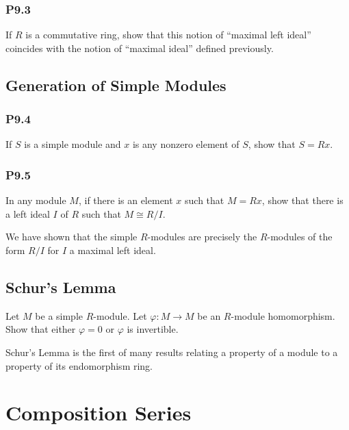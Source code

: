 \documentclass[lang=cn,11pt]{template}
\begin{document}
\subsection*{P9.3} If \( R \) is a commutative ring, show that this notion of “maximal left ideal” coincides with the notion of “maximal ideal” defined previously.

\section{Generation of Simple Modules}

\subsection*{P9.4} If \( S \) is a simple module and \( x \) is any nonzero element of \( S \), show that \( S = Rx \).

\subsection*{P9.5} In any module \( M \), if there is an element \( x \) such that \( M = Rx \), show that there is a left ideal \( I \) of \( R \) such that \( M \cong R/I \).

\begin{remark}
We have shown that the simple \( R \)-modules are precisely the \( R \)-modules of the form \( R/I \) for \( I \) a maximal left ideal.
\end{remark}

\section{Schur's Lemma}

\begin{theorem}
Let \( M \) be a simple \( R \)-module. Let \( \varphi : M \to M \) be an \( R \)-module homomorphism. Show that either \( \varphi = 0 \) or \( \varphi \) is invertible.
\end{theorem}

\begin{remark}
Schur’s Lemma is the first of many results relating a property of a module to a property of its endomorphism ring.
\end{remark}










\chapter{Composition Series}
\end{document}
